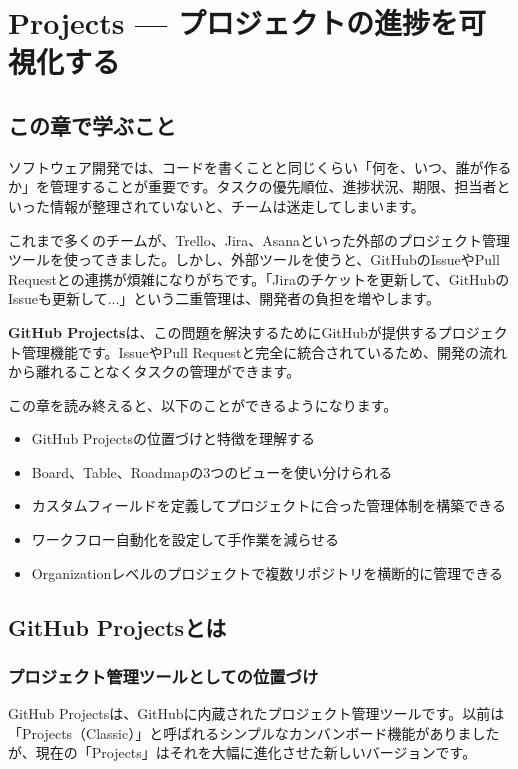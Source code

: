 \chapter{Projects --- プロジェクトの進捗を可視化する}

\section{この章で学ぶこと}

ソフトウェア開発では、コードを書くことと同じくらい「何を、いつ、誰が作るか」を管理することが重要です。タスクの優先順位、進捗状況、期限、担当者といった情報が整理されていないと、チームは迷走してしまいます。

これまで多くのチームが、Trello、Jira、Asanaといった外部のプロジェクト管理ツールを使ってきました。しかし、外部ツールを使うと、GitHubのIssueやPull Requestとの連携が煩雑になりがちです。「Jiraのチケットを更新して、GitHubのIssueも更新して...」という二重管理は、開発者の負担を増やします。

\textbf{GitHub Projects}は、この問題を解決するためにGitHubが提供するプロジェクト管理機能です。IssueやPull Requestと完全に統合されているため、開発の流れから離れることなくタスクの管理ができます。

この章を読み終えると、以下のことができるようになります。

\begin{itemize}
  \item GitHub Projectsの位置づけと特徴を理解する
  \item Board、Table、Roadmapの3つのビューを使い分けられる
  \item カスタムフィールドを定義してプロジェクトに合った管理体制を構築できる
  \item ワークフロー自動化を設定して手作業を減らせる
  \item Organizationレベルのプロジェクトで複数リポジトリを横断的に管理できる
\end{itemize}

\section{GitHub Projectsとは}

\subsection{プロジェクト管理ツールとしての位置づけ}

GitHub Projectsは、GitHubに内蔵されたプロジェクト管理ツールです。以前は「Projects（Classic）」と呼ばれるシンプルなカンバンボード機能がありましたが、現在の「Projects」はそれを大幅に進化させた新しいバージョンです。

